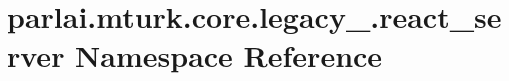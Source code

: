 \hypertarget{namespaceparlai_1_1mturk_1_1core_1_1legacy__2018_1_1react__server}{}\section{parlai.\+mturk.\+core.\+legacy\+\_.\+react\+\_\+server Namespace Reference}
\label{namespaceparlai_1_1mturk_1_1core_1_1legacy__2018_1_1react__server}
